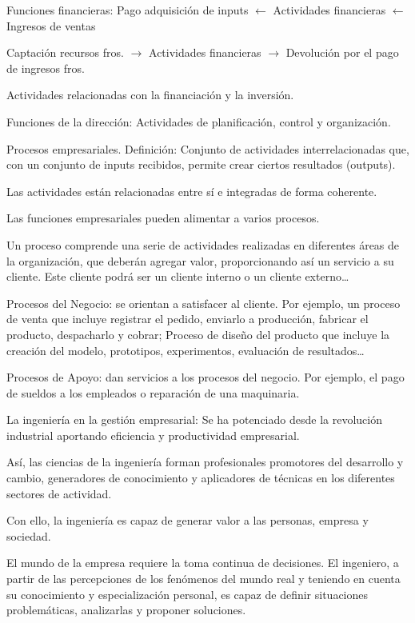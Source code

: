 \documentclass[12pt, twoside, openright]{report} %
\begin{document}
Funciones financieras: Pago adquisición de inputs $\leftarrow$ Actividades financieras $\leftarrow$ Ingresos de ventas

Captación recursos fros. $\rightarrow$ Actividades financieras $\rightarrow$ Devolución por el pago de ingresos fros.

Actividades relacionadas con la financiación y la inversión.

Funciones de la dirección: Actividades de planificación, control y organización.

Procesos empresariales. Definición: Conjunto de actividades interrelacionadas que, con un conjunto de
inputs recibidos, permite crear ciertos resultados (outputs).

Las actividades están relacionadas entre sí e integradas de forma coherente.

Las funciones empresariales pueden alimentar a varios procesos.

Un proceso comprende una serie de actividades realizadas en diferentes áreas de la organización, que
deberán agregar valor, proporcionando así un servicio a su cliente. Este cliente podrá ser un cliente interno
o un cliente externo…
\pagebreak

Procesos del Negocio: se orientan a satisfacer al cliente. Por ejemplo, un proceso de venta que incluye
registrar el pedido, enviarlo a producción, fabricar el producto, despacharlo y cobrar; Proceso de diseño del
producto que incluye la creación del modelo, prototipos, experimentos, evaluación de resultados…

Procesos de Apoyo: dan servicios a los procesos del negocio. Por ejemplo, el pago de sueldos a los empleados
o reparación de una maquinaria.

La ingeniería en la gestión empresarial: Se ha potenciado desde la revolución industrial aportando eficiencia
y productividad empresarial.

Así, las ciencias de la ingeniería forman profesionales promotores del desarrollo y cambio, generadores de
conocimiento y aplicadores de técnicas en los diferentes sectores de actividad.

Con ello, la ingeniería es capaz de generar valor a las personas, empresa y sociedad.

El mundo de la empresa requiere la toma continua de decisiones. El ingeniero, a partir de las percepciones
de los fenómenos del mundo real y teniendo en cuenta su conocimiento y especialización personal, es capaz
de definir situaciones problemáticas, analizarlas y proponer soluciones.
\end{document}
